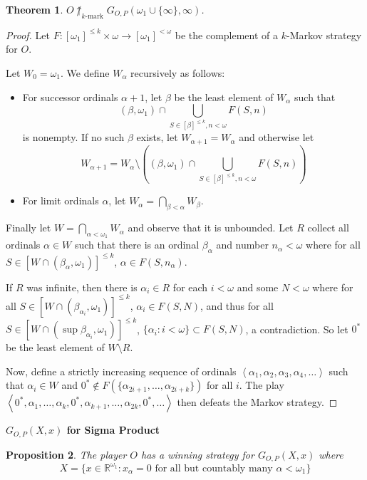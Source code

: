 \documentclass[11pt]{article}
\theoremstyle{plain}
\newtheorem{theorem}{Theorem}
\newtheorem{proposition}[theorem]{Proposition}
\theoremstyle{definition}
\theoremstyle{remark}
\newcommand{\kmarkwin}[1]{\uparrow_{#1\text{-mark}}}
\begin{document}
\begin{theorem}
$O\not\kmarkwin{k}G_{O,P}(\omega_1\cup\{\infty\},\infty)$.
\end{theorem}

\begin{proof}
Let $F:[\omega_1]^{\leq k}\times\omega\to[\omega_1]^{<\omega}$ be the complement of a $k$-Markov strategy for $O$.

Let $W_0=\omega_1$. We define $W_\alpha$ recursively as follows:
    \begin{itemize}
    \item For successor ordinals $\alpha+1$, let $\beta$ be the least element of $W_\alpha$ such that \[(\beta,\omega_1) \cap \bigcup_{S\in [\beta]^{\leq k}, n<\omega} F(S,n)\] is nonempty. If no such $\beta$ exists, let $W_{\alpha+1}=W_\alpha$ and otherwise let \[W_{\alpha+1}=W_\alpha \setminus \left((\beta,\omega_1) \cap \bigcup_{S\in[\beta]^{\leq k}, n<\omega} F(S,n)\right)\]
    \item For limit ordinals $\alpha$, let $W_\alpha = \bigcap_{\beta<\alpha} W_\beta$.
    \end{itemize}

Finally let $W=\bigcap_{\alpha<\omega_1}W_\alpha$ and observe that it is unbounded. Let $R$ collect all ordinals $\alpha\in W$ such that there is an ordinal $\beta_\alpha$ and number $n_\alpha<\omega$ where for all $S\in[W\cap(\beta_\alpha,\omega_1)]^{\leq k}$, $\alpha \in F(S,n_\alpha)$.

If $R$ was infinite, then there is $\alpha_i\in R$ for each $i<\omega$ and some $N<\omega$ where for all $S\in[W\cap(\beta_{\alpha_i},\omega_1)]^{\leq k}$, $\alpha_i \in F(S,N)$, and thus for all $S\in[W\cap(\sup \beta_{\alpha_i},\omega_1)]^{\leq k}$,  $\{\alpha_i : i<\omega\} \subset F(S,N)$, a contradiction. So let $0^*$ be the least element of $W\setminus R$.

Now, define a strictly increasing sequence of ordinals $\left<\alpha_1,\alpha_2,\alpha_3,\alpha_4,\dots\right>$ such that $\alpha_i \in W$ and $0^* \not\in F(\{\alpha_{2i+1},\dots,\alpha_{2i+k}\})$ for all $i$. The play $\left<0^*,\alpha_1,\dots,\alpha_k,0^*,\alpha_{k+1},\dots,\alpha_{2k},0^*,\dots\right>$ then defeats the Markov strategy.
\end{proof}





\centerline{\bf $G_{O,P}(X,x)$ for Sigma Product}

\begin{proposition}
The player $O$ has a winning strategy for $G_{O,P}(X,x)$ where \[X=\{x\in \mathbb{R}^{\omega_1}: x_\alpha = 0 \text{ for all but countably many } \alpha<\omega_1\}\]
\end{proposition}
\end{document}
